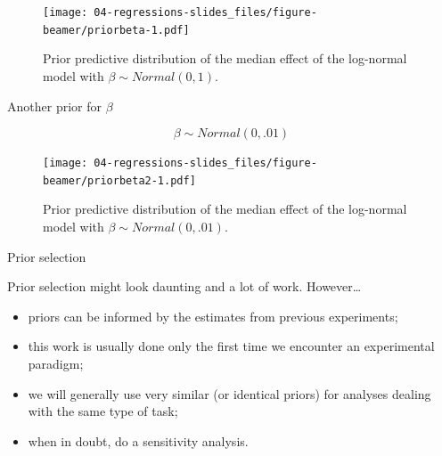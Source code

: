 \documentclass[12pt,ignorenonframetext,aspectratio=169]{beamer}
\newenvironment{Shaded}{\begin{snugshade}}{\end{snugshade}}
\newcommand{\KeywordTok}[1]{\textcolor[rgb]{0.13,0.29,0.53}{\textbf{#1}}}
\newcommand{\NormalTok}[1]{#1}
\newcommand{\OperatorTok}[1]{\textcolor[rgb]{0.81,0.36,0.00}{\textbf{#1}}}
\newcommand{\StringTok}[1]{\textcolor[rgb]{0.31,0.60,0.02}{#1}}
\providecommand{\tightlist}{%
  \setlength{\itemsep}{0pt}\setlength{\parskip}{0pt}}
\begin{document}
\begin{frame}[fragile]

\vspace{.1in}



\scriptsize

\begin{Shaded}
\end{Shaded}

\begin{figure}
\centering
\texttt{[image: 04-regressions-slides\_files/figure-beamer/priorbeta-1.pdf]}
\caption{\label{fig:priorbeta}Prior predictive distribution of the median effect of the log-normal model with \(\beta \sim Normal(0, 1)\).}
\end{figure}

\normalsize

\end{frame}

\begin{frame}{Another prior for \(\beta\)}
\protect\hypertarget{another-prior-for-beta}{}

\begin{equation}
\beta \sim Normal(0, .01)
\end{equation}

\scriptsize

\normalsize



\scriptsize

\begin{figure}
\centering
\texttt{[image: 04-regressions-slides\_files/figure-beamer/priorbeta2-1.pdf]}
\caption{\label{fig:priorbeta2}Prior predictive distribution of the median effect of the log-normal model with \(\beta \sim Normal(0, .01)\).}
\end{figure}

\normalsize

\end{frame}

\begin{frame}{Prior selection}
\protect\hypertarget{prior-selection}{}

Prior selection might look daunting and a lot of work. However\ldots{}

\begin{itemize}
\tightlist
\item
  priors can be informed by the estimates from previous experiments;
\item
  this work is usually done only the first time we encounter an experimental paradigm;
\item
  we will generally use very similar (or identical priors) for analyses dealing with the same type of task;
\item
  when in doubt, do a sensitivity analysis.
\end{itemize}

\end{frame}
\end{document}
